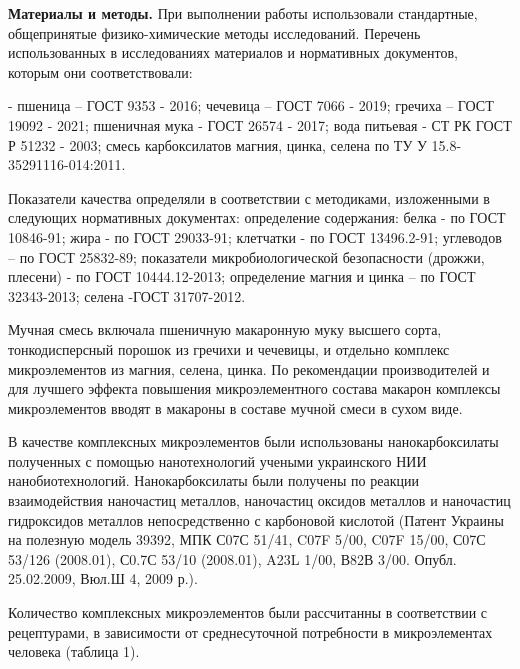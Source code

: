 \begin{multicols}{2}
{\bfseries Материалы и методы.} При выполнении работы использовали
стандартные, общепринятые физико-химические методы исследований.
Перечень использованных в исследованиях материалов и нормативных
документов, которым они соответствовали:

- пшеница -- ГОСТ 9353 - 2016; чечевица -- ГОСТ 7066 - 2019; гречиха --
ГОСТ 19092 - 2021; пшеничная мука - ГОСТ 26574 - 2017; вода питьевая -
СТ РК ГОСТ Р 51232 - 2003; смесь карбоксилатов магния, цинка, селена по
ТУ У 15.8-35291116-014:2011.

Показатели качества определяли в соответствии с методиками, изложенными
в следующих нормативных документах: определение содержания: белка - по
ГОСТ 10846-91; жира - по ГОСТ 29033-91; клетчатки - по ГОСТ 13496.2-91;
углеводов -- по ГОСТ 25832-89; показатели микробиологической
безопасности (дрожжи, плесени) - по ГОСТ 10444.12-2013; определение
магния и цинка -- по ГОСТ 32343-2013; селена -ГОСТ 31707-2012.

Мучная смесь включала пшеничную макаронную муку высшего сорта,
тонкодисперсный порошок из гречихи и чечевицы, и отдельно комплекс
микроэлементов из магния, селена, цинка. По рекомендации производителей
и для лучшего эффекта повышения микроэлементного состава макарон
комплексы микроэлементов вводят в макароны в составе мучной смеси в
сухом виде.

В качестве комплексных микроэлементов были использованы нанокарбоксилаты
полученных с помощью нанотехнологий учеными украинского НИИ
нанобиотехнологий. Нанокарбоксилаты были получены по реакции
взаимодействия наночастиц металлов, наночастиц оксидов металлов и
наночастиц гидроксидов металлов непосредственно с карбоновой кислотой
(Патент Украины на полезную модель 39392, МПК С07С 51/41, C07F 5/00,
C07F 15/00, С07С 53/126 (2008.01), С0.7С 53/10 (2008.01), A23L 1/00,
В82В 3/00. Опубл. 25.02.2009, Вюл.Ш 4, 2009 р.).

Количество комплексных микроэлементов были рассчитанны в соответствии с
рецептурами, в зависимости от среднесуточной потребности в
микроэлементах человека (таблица 1).
\end{multicols}


